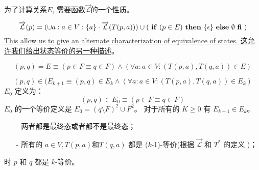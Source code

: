 为了计算关系$E$, 需要函数$\overrightarrow{\mathcal{L}}$的一个性质。
\newline

$$ \overrightarrow{\mathcal{L}}(p) = (\cup a:a \in V : \{a\} \cdot \overrightarrow{\mathcal{L}}(T(p,a))) \cup ( \mbox{ \textbf{if} }   (p \in E) \mbox{ \textbf{then} }   \{\epsilon\} \mbox{ \textbf{else} }   {\emptyset  \mbox{ \textbf{fi} }}) $$
\uline{This allow us to give an alternate characterization of equivalence of states. 这允许我们给出状态等价的另一种描述}。  
\newline

$$ (p,q) = E \equiv ( p \in F \equiv q \in F ) \land ( \forall a:a \in V : (T(p,a),T(q,a)) \in E )$$
\newline

\newline

\newline

$$ (p,q) \in (E_{k+1} \equiv (p,q) \in E_k \land (\forall a:a \in V : (T(p,a),T(q,a))\in E_k ) $$
$E_0$ 定义为：
$$ (p,q) \in E_0 \equiv (p \in F \equiv q \in F)  $$
$E_0$ 的一个等价定义是 $E_0 = (q \setminus F)^2 \cup F^2$。 对于所有的 $K \ge 0$ 有 $E_{k+1} \in E_k$。
\newline

\newline


\begin{itemize}
    \item [-] 两者都是最终态或者都不是最终态；
    \item [-] 所有的 $a\in V,T(p,a) \mbox{和} T(q,a)$ 都是 ($k$-1)-等价(根据 $\overrightarrow{\mathcal{L}}$ 和 $T^*$ 的定义  )；
\end{itemize}
时 $p$ 和 $q$ 都是 $k$-等价。
\newline

